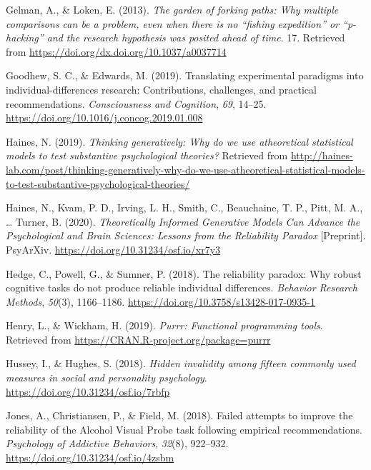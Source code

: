 \documentclass[
  man,floatsintext]{apa6}
\newlength{\cslhangindent}
\newlength{\cslentryspacingunit} %
\newenvironment{CSLReferences}[2] %
 {%
  \setlength{\parindent}{0pt}
  \ifodd #1
  \let\oldpar\par
  \def\par{\hangindent=\cslhangindent\oldpar}
  \fi
  \setlength{\parskip}{#2\cslentryspacingunit}
 }%
 {}
\begin{document}
\begin{CSLReferences}{1}{0}
\leavevmode{}%
Gelman, A., \& Loken, E. (2013). \emph{The garden of forking paths: {Why} multiple comparisons can be a problem, even when there is no {``ﬁshing expedition''} or {``p-hacking''} and the research hypothesis was posited ahead of time}. 17. Retrieved from \url{https://doi.org/dx.doi.org/10.1037/a0037714}

\leavevmode{}%
Goodhew, S. C., \& Edwards, M. (2019). Translating experimental paradigms into individual-differences research: {Contributions}, challenges, and practical recommendations. \emph{Consciousness and Cognition}, \emph{69}, 14--25. \url{https://doi.org/10.1016/j.concog.2019.01.008}

\leavevmode{}%
Haines, N. (2019). \emph{Thinking generatively: {Why} do we use atheoretical statistical models to test substantive psychological theories?} Retrieved from \url{http://haines-lab.com/post/thinking-generatively-why-do-we-use-atheoretical-statistical-models-to-test-substantive-psychological-theories/}

\leavevmode{}%
Haines, N., Kvam, P. D., Irving, L. H., Smith, C., Beauchaine, T. P., Pitt, M. A., \ldots{} Turner, B. (2020). \emph{Theoretically {Informed} {Generative} {Models} {Can} {Advance} the {Psychological} and {Brain} {Sciences}: {Lessons} from the {Reliability} {Paradox}} {[}Preprint{]}. PsyArXiv. \url{https://doi.org/10.31234/osf.io/xr7y3}

\leavevmode{}%
Hedge, C., Powell, G., \& Sumner, P. (2018). The reliability paradox: {Why} robust cognitive tasks do not produce reliable individual differences. \emph{Behavior Research Methods}, \emph{50}(3), 1166--1186. \url{https://doi.org/10.3758/s13428-017-0935-1}

\leavevmode{}%
Henry, L., \& Wickham, H. (2019). \emph{Purrr: Functional programming tools}. Retrieved from \url{https://CRAN.R-project.org/package=purrr}

\leavevmode{}%
Hussey, I., \& Hughes, S. (2018). \emph{Hidden invalidity among fifteen commonly used measures in social and personality psychology}. \url{https://doi.org/10.31234/osf.io/7rbfp}

\leavevmode{}%
Jones, A., Christiansen, P., \& Field, M. (2018). Failed attempts to improve the reliability of the {Alcohol} {Visual} {Probe} task following empirical recommendations. \emph{Psychology of Addictive Behaviors}, \emph{32}(8), 922--932. \url{https://doi.org/10.31234/osf.io/4zsbm}


\end{CSLReferences}
\end{document}
